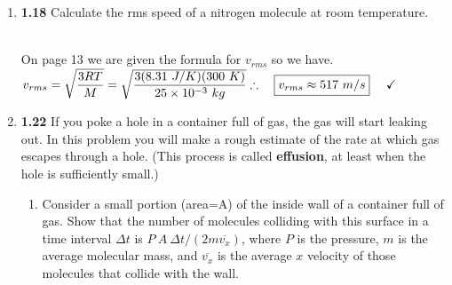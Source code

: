 \documentclass[fleqn]{article}
\begin{document}
\begin{enumerate}
\begin{enumerate}
    \end{enumerate}
    
    \item \textbf{1.18} Calculate the rms speed of a nitrogen molecule at room temperature.

        \textcolor{hwColor}{
          \\
          On page 13 we are given the formula for $v_{rms}$ so we have.
          $
            \\
            \\
            v_{rms}=\sqrt{\dfrac{3RT}{M}}=\sqrt{\dfrac{3 (8.31 ~ J/K) (300 ~ K)}{25 \times 10^{-3} ~ kg}}
            \\
            \\
            \\
            \therefore ~~~ \boxed{
              v_{rms} \approx 517 ~ m/s
            } ~~~~ \checkmark
            \\
          $
        }
    
    \item \textbf{1.22} If you poke a hole in a container full of gas, the gas will start leaking out. In this problem you 
    will make a rough estimate of the rate at which gas escapes through a hole. (This process is called \textbf{effusion}, at least when 
    the hole is sufficiently small.)

      \begin{enumerate}
        \item Consider a small portion (area=A) of the inside wall of a container full of gas. Show that the number of molecules colliding
        with this surface in a time interval $\Delta t$ is $P ~ A ~ \Delta t/(2m \overline{v_x})$, where $P$ is the pressure, $m$ is the 
        average molecular mass, and $\overline{v_x}$ is the average $x$ velocity of those molecules that collide with the wall.


\end{enumerate}
\end{enumerate}
\end{document}
